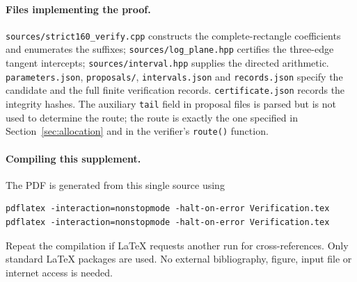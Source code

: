 \documentclass[11pt,a4paper]{article}
\begin{document}
\paragraph{Files implementing the proof.}
\texttt{sources/strict160\_verify.cpp} constructs the complete-rectangle
coefficients and enumerates the suffixes;
\texttt{sources/log\_plane.hpp} certifies the three-edge tangent intercepts;
\texttt{sources/interval.hpp} supplies the directed arithmetic.
\texttt{parameters.json}, \texttt{proposals/}, \texttt{intervals.json} and
\texttt{records.json} specify the candidate and the full finite verification
records. \texttt{certificate.json} records the integrity hashes.
The auxiliary \texttt{tail} field in proposal files is parsed but is not used
to determine the route; the route is exactly the one specified in
Section~\ref{sec:allocation} and in the verifier's \texttt{route()} function.

\paragraph{Compiling this supplement.}
The PDF is generated from this single source using
\begin{verbatim}
pdflatex -interaction=nonstopmode -halt-on-error Verification.tex
pdflatex -interaction=nonstopmode -halt-on-error Verification.tex
\end{verbatim}
Repeat the compilation if LaTeX requests another run for cross-references.
Only standard LaTeX packages are used. No external bibliography, figure,
input file or internet access is needed.
\end{document}
